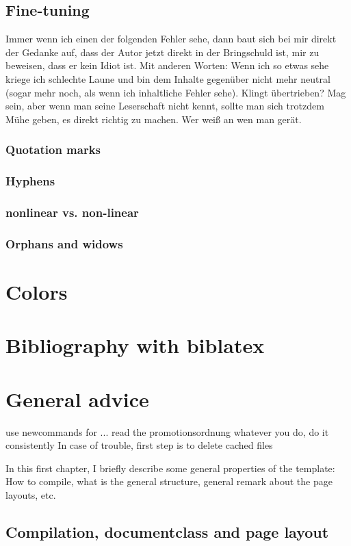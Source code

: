 \section{Fine-tuning}
Immer wenn ich einen der folgenden Fehler sehe, dann baut sich bei mir direkt der Gedanke auf, dass der Autor jetzt direkt in der Bringschuld ist, mir zu beweisen, dass er kein Idiot ist. Mit anderen Worten: Wenn ich so etwas sehe kriege ich schlechte Laune und bin dem Inhalte gegenüber nicht mehr neutral (sogar mehr noch, als wenn ich inhaltliche Fehler sehe). Klingt übertrieben? Mag sein, aber wenn man seine Leserschaft nicht kennt, sollte man sich trotzdem Mühe geben, es direkt richtig zu machen. Wer weiß an wen man gerät.
\subsection{Quotation marks}
\subsection{Hyphens}
\subsection{nonlinear vs. non-linear}
\subsection{Orphans and widows}

\chapter{Colors}
\chapter{Bibliography with biblatex}\label{chap:biblatex}

\chapter{General advice}
use newcommands for ...
read the promotionsordnung
whatever you do, do it consistently
In case of trouble, first step is to delete cached files


In this first chapter, I briefly describe some general properties of the template: How to compile, what is the general structure, general remark about the page layouts, etc.

\section{Compilation, documentclass and page layout}

